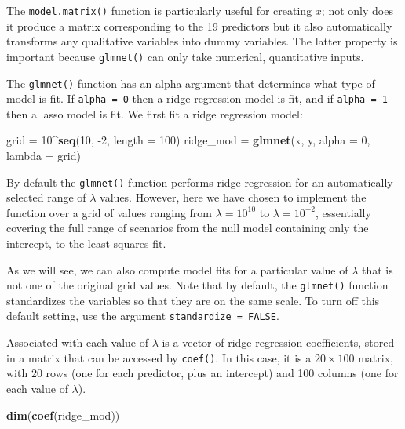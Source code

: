 \documentclass[openany]{book}
\newenvironment{Shaded}{\begin{snugshade}}{\end{snugshade}}
\newcommand{\DataTypeTok}[1]{\textcolor[rgb]{0.13,0.29,0.53}{#1}}
\newcommand{\DecValTok}[1]{\textcolor[rgb]{0.00,0.00,0.81}{#1}}
\newcommand{\KeywordTok}[1]{\textcolor[rgb]{0.13,0.29,0.53}{\textbf{#1}}}
\newcommand{\NormalTok}[1]{#1}
\newcommand{\OperatorTok}[1]{\textcolor[rgb]{0.81,0.36,0.00}{\textbf{#1}}}
\newcommand{\StringTok}[1]{\textcolor[rgb]{0.31,0.60,0.02}{#1}}
\begin{document}
The \texttt{model.matrix()} function is particularly useful for creating \(x\); not only
does it produce a matrix corresponding to the 19 predictors but it also
automatically transforms any qualitative variables into dummy variables.
The latter property is important because \texttt{glmnet()} can only take numerical,
quantitative inputs.

The \texttt{glmnet()} function has an alpha argument that determines what type
of model is fit. If \texttt{alpha\ =\ 0} then a ridge regression model is fit, and if \texttt{alpha\ =\ 1}
then a lasso model is fit. We first fit a ridge regression model:

\begin{Shaded}
\begin{Highlighting}[]
\NormalTok{grid =}\StringTok{ }\DecValTok{10}\OperatorTok{^}\KeywordTok{seq}\NormalTok{(}\DecValTok{10}\NormalTok{, }\DecValTok{-2}\NormalTok{, }\DataTypeTok{length =} \DecValTok{100}\NormalTok{)}
\NormalTok{ridge_mod =}\StringTok{ }\KeywordTok{glmnet}\NormalTok{(x, y, }\DataTypeTok{alpha =} \DecValTok{0}\NormalTok{, }\DataTypeTok{lambda =}\NormalTok{ grid)}
\end{Highlighting}
\end{Shaded}

By default the \texttt{glmnet()} function performs ridge regression for an automatically
selected range of \(\lambda\) values. However, here we have chosen to implement
the function over a grid of values ranging from \(\lambda = 10^10\) to \(\lambda = 10^{-2}\), essentially covering the full range of scenarios from the null model containing
only the intercept, to the least squares fit.

As we will see, we can also compute
model fits for a particular value of \(\lambda\) that is not one of the original
grid values. Note that by default, the \texttt{glmnet()} function standardizes the
variables so that they are on the same scale. To turn off this default setting,
use the argument \texttt{standardize\ =\ FALSE}.

Associated with each value of \(\lambda\) is a vector of ridge regression coefficients,
stored in a matrix that can be accessed by \texttt{coef()}. In this case, it is a \(20 \times 100\)
matrix, with 20 rows (one for each predictor, plus an intercept) and 100
columns (one for each value of \(\lambda\)).

\begin{Shaded}
\begin{Highlighting}[]
\KeywordTok{dim}\NormalTok{(}\KeywordTok{coef}\NormalTok{(ridge_mod))}
\end{Highlighting}
\end{Shaded}
\end{document}
